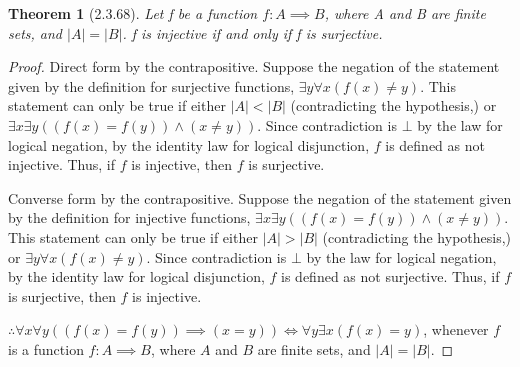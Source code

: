 \documentclass[a4paper, 12pt]{article}
\theoremstyle{plain}
\newtheorem*{theorem*}{Theorem}
\begin{document}
	
	\begin{theorem*}[2.3.68]
		Let f be a function $f: A \implies B$, where A and B are finite sets, and $|A| = |B|$. f 
		is injective if and only if f is surjective.
	\end{theorem*}
	
	\begin{proof}
		Direct form by the contrapositive. Suppose the negation of the \newline statement given by 
		the definition for surjective functions, $\exists y \forall x (f(x) \ne y)$. This statement 
		can only be true if either $|A| < |B|$ (contradicting the \newline hypothesis,) or $\exists 
		x \exists y ((f(x) = f(y)) \land (x \ne y))$. Since contradiction is $\bot$ by the law for 
		logical negation, by the identity law for logical disjunction, $f$ is defined as not 
		injective. Thus, if $f$ is injective, then $f$ is surjective.
		
		Converse form by the contrapositive. Suppose the negation of the \newline statement given 
		by the definition for injective functions, \newline 
		$\exists x \exists y ((f(x) = f(y)) \land (x \ne y))$. 
		This statement can only be true if either $|A| > |B|$ (contradicting the hypothesis,) or 
		$\exists y \forall x (f(x) \ne y)$. Since \newline contradiction is $\bot$ by the law for 
		logical negation, by the identity law for logical disjunction, $f$ is defined as not 
		surjective. Thus, if $f$ is surjective, then $f$ is injective.
		
		$\therefore \forall x \forall y ((f(x) = f(y)) \implies 
		(x = y)) \iff \forall y \exists x (f(x) = y)$, whenever $f$ is a function $f: A \implies B$, 
		where $A$ and $B$ are finite sets, and $|A| = |B|$.
	\end{proof}
\end{document}
